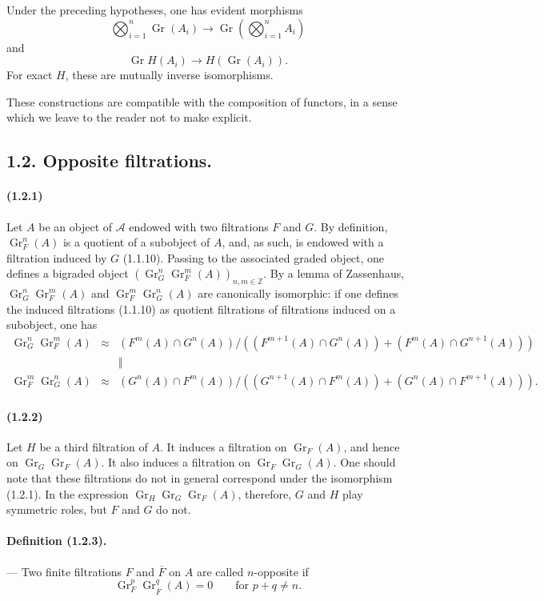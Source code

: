 \documentclass[10pt]{article}
\newcommand{\Z}{\mathbb Z}
\newcommand{\Gr}{\operatorname{Gr}}
\newcommand{\calA}{\mathcal A}
\begin{document}
Under the preceding hypotheses, one has evident morphisms
\[
\bigotimes_{i=1}^n\Gr(A_i)\to \Gr\left(\bigotimes_{i=1}^nA_i\right)
\]
and
\[
\Gr H(A_i)\to H(\Gr(A_i)).
\]
For exact $H$, these are mutually inverse isomorphisms.

These constructions are compatible with the composition of functors, in a sense which we leave to the reader not to make explicit.

\subsection*{1.2. Opposite filtrations.}

\paragraph{(1.2.1)} Let $A$ be an object of $\calA$ endowed with two filtrations $F$ and $G$. By definition, $\Gr_F^n(A)$ is a quotient of a subobject of $A$, and, as such, is endowed with a filtration induced by $G$ (1.1.10). Passing to the associated graded object, one defines a bigraded object $(\Gr_G^n\Gr_F^m(A))_{n,m\in\Z}$. By a lemma of Zassenhaus, $\Gr_G^n\Gr_F^m(A)$ and $\Gr_F^m\Gr_G^n(A)$ are canonically isomorphic: if one defines the induced filtrations (1.1.10) as quotient filtrations of filtrations induced on a subobject, one has
\[
\begin{array}{rcc}
\Gr_G^n\Gr_F^m(A)&\approx&
(F^m(A)\cap G^n(A))/((F^{m+1}(A)\cap G^n(A))+(F^m(A)\cap G^{n+1}(A)))\\
&&\Big\Vert\\
\Gr_F^m\Gr_G^n(A)&\approx&
(G^n(A)\cap F^m(A))/((G^{n+1}(A)\cap F^m(A))+(G^n(A)\cap F^{m+1}(A))).
\end{array}
\]

\paragraph{(1.2.2)} Let $H$ be a third filtration of $A$. It induces a filtration on $\Gr_F(A)$, and hence on $\Gr_G\Gr_F(A)$. It also induces a filtration on $\Gr_F\Gr_G(A)$. One should note that these filtrations do not in general correspond under the isomorphism (1.2.1). In the expression $\Gr_H\Gr_G\Gr_F(A)$, therefore, $G$ and $H$ play symmetric roles, but $F$ and $G$ do not.

\paragraph{Definition (1.2.3).} --- Two finite filtrations $F$ and $\overline F$ on $A$ are called $n$-opposite if
\[
\Gr_F^p\Gr_{\overline F}^{q}(A)=0\qquad\text{for }p+q\ne n.
\]
\end{document}
